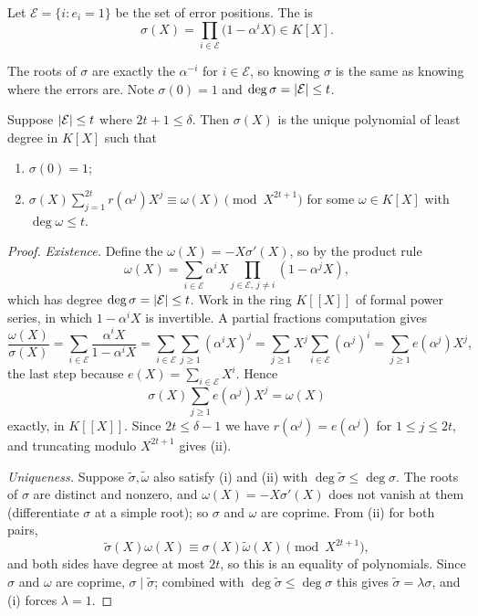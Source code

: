\documentclass[a4paper]{scrartcl}
\newcommand{\Ec}{\mathcal{E}}
\begin{document}
\begin{definition}
	Let $\Ec = \{i : e_i = 1\}$ be the set of error positions. The  is
	$$\sigma(X) = \prod_{i\in\Ec}\bigl(1-\alpha^iX\bigr) \in K[X].$$
\end{definition}

The roots of $\sigma$ are exactly the $\alpha^{-i}$ for $i \in \Ec$, so knowing $\sigma$ is the same as knowing where the errors are. Note $\sigma(0)=1$ and $\deg\sigma = \abs{\Ec} \le t$.

\begin{theorem}\label{thm:errorlocator}
	Suppose $\abs{\Ec}\le t$ where $2t+1\le\delta$. Then $\sigma(X)$ is the unique polynomial of least degree in $K[X]$ such that
	\begin{enumerate}[label=(\roman*)]
		\item $\sigma(0) = 1$;
		\item $\displaystyle \sigma(X)\sum_{j=1}^{2t}r(\alpha^j)X^j \equiv \omega(X) \pmod{X^{2t+1}}$ for some $\omega \in K[X]$ with $\deg\omega\le t$.
	\end{enumerate}
\end{theorem}

\begin{proof}
	\emph{Existence.} Define the  $\omega(X) = -X\sigma'(X)$, so by the product rule
	$$\omega(X) = \sum_{i\in\Ec}\alpha^iX\prod_{j\in\Ec,\, j\ne i}(1-\alpha^jX),$$
	which has degree $\deg \sigma = \abs{\Ec}\le t$. Work in the ring $K[[X]]$ of formal power series, in which $1-\alpha^iX$ is invertible. A partial fractions computation gives
	$$\frac{\omega(X)}{\sigma(X)} = \sum_{i\in\Ec}\frac{\alpha^iX}{1-\alpha^iX} = \sum_{i\in\Ec}\sum_{j\ge1}(\alpha^iX)^j = \sum_{j\ge1}X^j\sum_{i\in\Ec}(\alpha^j)^i = \sum_{j\ge1}e(\alpha^j)X^j,$$
	the last step because $e(X) = \sum_{i\in\Ec}X^i$. Hence
	$$\sigma(X)\sum_{j\ge1}e(\alpha^j)X^j = \omega(X)$$
	exactly, in $K[[X]]$. Since $2t \le \delta-1$ we have $r(\alpha^j)=e(\alpha^j)$ for $1 \le j\le 2t$, and truncating modulo $X^{2t+1}$ gives (ii).

	\emph{Uniqueness.} Suppose $\widetilde\sigma,\widetilde\omega$ also satisfy (i) and (ii) with $\deg\widetilde\sigma\le\deg\sigma$. The roots of $\sigma$ are distinct and nonzero, and $\omega(X) = -X\sigma'(X)$ does not vanish at them (differentiate $\sigma$ at a simple root); so $\sigma$ and $\omega$ are coprime. From (ii) for both pairs,
	$$\widetilde\sigma(X)\omega(X)\equiv\sigma(X)\widetilde\omega(X) \pmod{X^{2t+1}},$$
	and both sides have degree at most $2t$, so this is an equality of polynomials. Since $\sigma$ and $\omega$ are coprime, $\sigma\mid\widetilde\sigma$; combined with $\deg\widetilde\sigma\le\deg\sigma$ this gives $\widetilde\sigma = \lambda\sigma$, and (i) forces $\lambda = 1$.
\end{proof}
\end{document}
